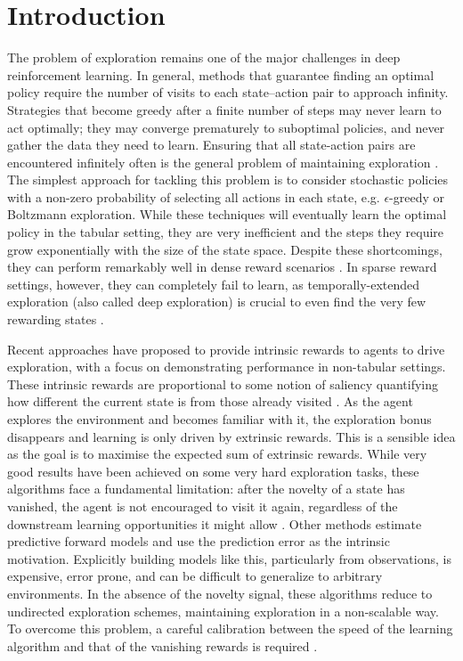 \documentclass{article} %
\begin{document}
\section{Introduction}
\label{intro}
The problem of exploration remains one of the major challenges in deep reinforcement learning.  In general, methods that guarantee finding an optimal policy require the number of visits to each state–action pair to approach infinity. Strategies that become greedy after a finite number of steps may never learn to act optimally; they may converge prematurely to suboptimal policies, and never gather the data they need to learn. Ensuring that all state-action pairs are encountered infinitely often is the general problem of maintaining exploration \citep{franccois2018introduction,sutton2018reinforcement}. 
%
The simplest approach for tackling this problem is to consider stochastic policies with a non-zero probability of selecting all actions in each state, e.g. $\epsilon$-greedy or Boltzmann exploration. While these techniques will eventually learn the optimal policy in the tabular setting, they are very inefficient and the steps they require grow exponentially with the size of the state space. Despite these shortcomings, they can perform remarkably well in dense reward scenarios \citep{mnih2015human}. In sparse reward settings, however, they can completely fail to learn, as temporally-extended exploration (also called deep exploration) is crucial to even find the very few rewarding states \citep{osband2016deep}.

Recent approaches have proposed to provide intrinsic rewards to agents to drive exploration, with a focus on demonstrating performance in non-tabular settings. These intrinsic rewards are proportional to some notion of saliency quantifying how different the current state is from those already visited \citep{bellemare2016unifying, haber2018learning,houthooft2016vime,oh2015action,ostrovski2017count,pathak2017curiosity,stadie2015incentivizing}. 
%
As the agent explores the environment and becomes familiar with it, the exploration bonus disappears and learning is only driven by extrinsic rewards. This is a sensible idea as the goal is to maximise the expected sum of extrinsic rewards. While very good results have been achieved on some very hard exploration tasks, these algorithms face a fundamental limitation: after the novelty of a state has vanished, the agent is not encouraged to visit it again, regardless of the downstream learning opportunities it might allow \citep{bellemare2016unifying, ecoffet2019go, stanton2018deep}.
Other methods estimate predictive forward models \citep{haber2018learning,houthooft2016vime,oh2015action,pathak2017curiosity,stadie2015incentivizing} and use the prediction error as the intrinsic motivation.
Explicitly building models like this, particularly from observations, is expensive, error prone, and can be difficult to generalize to arbitrary environments.
In the absence of the novelty signal, these algorithms reduce to undirected exploration schemes, maintaining exploration in a non-scalable way. To overcome this problem, a careful calibration between the speed of the learning algorithm and that of the vanishing rewards is required \citep{ecoffet2019go,ostrovski2017count}.
\end{document}

